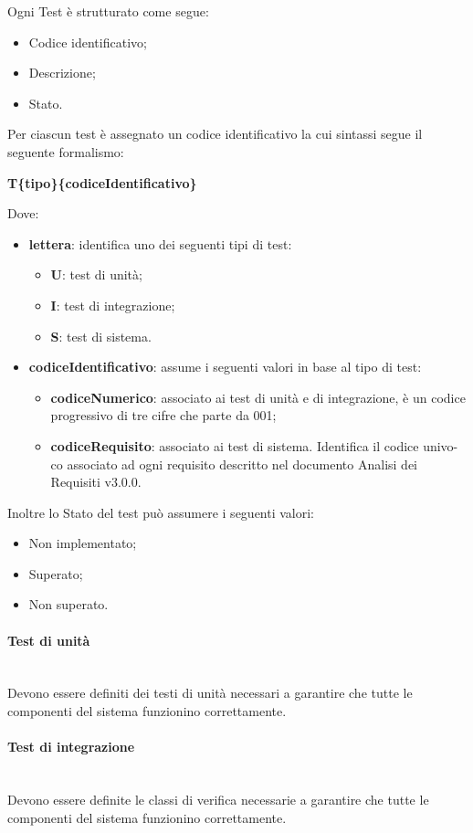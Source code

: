 Ogni Test è strutturato come segue:
\begin{itemize}
\item Codice identificativo; 
\item Descrizione;
\item Stato. 
\end{itemize}
Per ciascun test è assegnato un codice identificativo la cui sintassi segue il seguente
formalismo:
\begin{center}
\textbf{T\{tipo\}\{codiceIdentificativo\}}
\end{center}
Dove: 
\begin{itemize}
\item \textbf{lettera}: identifica uno dei seguenti tipi di test:
	\begin{itemize}
		\item \textbf{U}: test di unità; 
		\item \textbf{I}: test di integrazione; 
		\item \textbf{S}: test di sistema.
	\end{itemize}
\item \textbf{codiceIdentificativo}: assume i seguenti valori in base al tipo di test:
	\begin{itemize}
	\item \textbf{codiceNumerico}: associato ai test di unità e di integrazione, è un codice
progressivo di tre cifre che parte da 001;
	\item \textbf{codiceRequisito}: associato ai test di sistema. Identifica il codice univo-
co associato ad ogni requisito descritto nel documento Analisi dei Requisiti
v3.0.0.
	\end{itemize}
\end{itemize}	
Inoltre lo Stato del test può assumere i seguenti valori:
\begin{itemize}
\item Non implementato;  
\item Superato; 
\item Non superato. 
\end{itemize}

\paragraph{Test di unità}\mbox{}\\
Devono essere definiti dei testi di unità necessari a garantire che tutte le componenti del sistema funzionino correttamente.

\paragraph{Test di integrazione}\mbox{}\\
Devono essere definite le classi di verifica necessarie a garantire che tutte le componenti del sistema funzionino correttamente.

